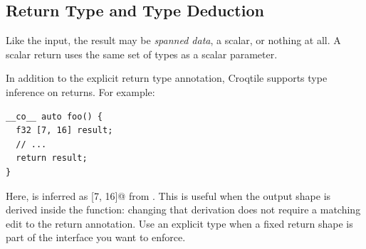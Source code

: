 \subsection*{Return Type and Type Deduction}

Like the input, the result may be \emph{spanned data}, a scalar, or nothing at all. A scalar return uses the same set of types as a scalar parameter.

In addition to the explicit return type annotation, Croqtile supports type inference on returns. For example:

\begin{lstlisting}[language=croqtile,caption={Return Type and Type Deduction}]
__co__ auto foo() {
  f32 [7, 16] result;
  // ...
  return result;
}
\end{lstlisting}

Here, \co@auto@ is inferred as  [7, 16]@ from \co@result@. This is useful when the output shape is derived inside the function: changing that derivation does not require a matching edit to the return annotation. Use an explicit type when a fixed return shape is part of the interface you want to enforce.
